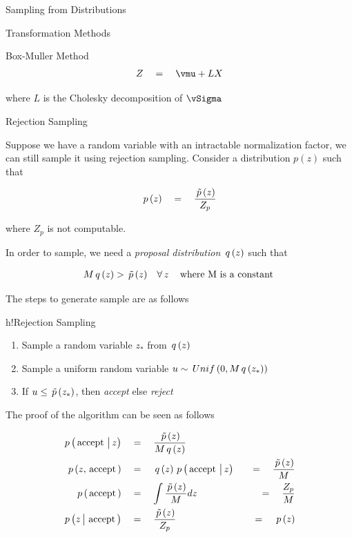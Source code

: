 \documentclass{article}
\begin{document}
\begin{ssection}{Sampling from Distributions}
\begin{ssubsection}{Transformation Methods}
\begin{sssubsection}{Box-Muller Method}
			\begin{align*}
				Z	\eq		\vmu + LX
			\end{align*}

			where $L$ is the Cholesky decomposition of $\vSigma$

			
		\end{sssubsection}
		
	\end{ssubsection}

	\begin{ssubsection}{Rejection Sampling}

		Suppose we have a random variable with an intractable normalization factor, we can still sample it using rejection sampling. Consider a distribution $p(z)$ such that

		\begin{align*}
			\prob{z}	\eq \frac{\aprob{z}}{Z_p}
		\end{align*}

		where $Z_p$ is not computable. \br%

		In order to sample, we need a \textit{proposal distribution} $\func{q}{z}$ such that

		\begin{align*}
			M \func{q}{z} > \aprob{z}	&&	\forall\, z \quad \mt{where M is a constant}
		\end{align*}

		The steps to generate sample are as follows

		\begin{algo}{h!}{Rejection Sampling}

			\begin{enumerate}
				\item Sample a random variable $z_\ast$ from $\func{q}{z}$
				\item Sample a uniform random variable $u \sim \func{Unif}{0, M \func{q}{z_\ast}}$
				\item If $u \le \aprob{z_\ast}$, then \textit{accept} else \textit{reject}
			\end{enumerate}
			
		\end{algo}

		The proof of the algorithm can be seen as follows

		\begin{align*}
			\prob{\mt{accept} \pipe z}	&\eq	\frac{\aprob{z}}{M \func{q}{z}} \\
			\prob{z, \mt{accept}}		&\eq	\func{q}{z} \prob{\mt{accept} \pipe z} 	&\eq \frac{\aprob{z}}{M} \\
			\prob{\mt{accept}}			&\eq	\int \frac{\aprob{z}}{M} dz				&\eq	\frac{Z_p}{M} \\
			\prob{z \pipe \mt{accept}}	&\eq	\frac{\aprob{z}}{Z_p}					&\eq	\prob{z}
		\end{align*}
		

\end{ssubsection}
\end{ssection}
\end{document}
